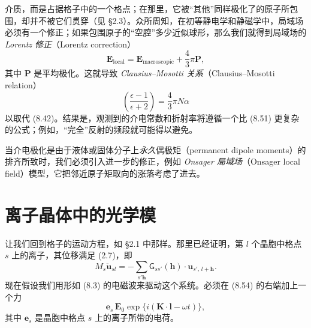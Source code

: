介质，而是占据格子中的一个格点；在那里，它被“其他”同样极化了的原子所包围，却并不被它们贯穿（见 §2.3）。众所周知，在初等静电学和静磁学中，局域场必须有一个修正；如果包围原子的“空腔”多少近似球形，那么我们就得到局域场的 \emph{Lorentz 修正}（Lorentz correction）
\begin{equation*}
\mathbf{E}_{\mathrm{local}} = \mathbf{E}_{\mathrm{macroscopic}} + \frac{4}{3}\pi\mathbf{P},\tag{8.52}
\end{equation*}
其中 $\mathbf{P}$ 是平均极化。这就导致 \emph{Clausius–Mosotti 关系}（Clausius–Mosotti relation）
\begin{equation*}
\left(\frac{\epsilon-1}{\epsilon+2}\right) = \frac{4}{3}\pi N\alpha\tag{8.53}
\end{equation*}
以取代 (8.42)。结果是，观测到的介电常数和折射率将遵循一个比 (8.51) 更复杂的公式；例如，“完全”反射的频段就可能得以避免。

当介电极化是由于液体或固体分子上\emph{永久}偶极矩（permanent dipole moments）的排齐所致时，我们必须引入进一步的修正，例如 \emph{Onsager 局域场}（Onsager local field）模型，它把邻近原子矩取向的涨落考虑了进去。

\section{离子晶体中的光学模}

让我们回到格子的运动方程，如 §2.1 中那样。那里已经证明，第 $l$ 个晶胞中格点 $s$ 上的离子，其位移满足 (2.7)，即
\begin{equation*}
M_s \ddot{\mathbf{u}}_{sl} = -\sum_{s'\boldsymbol{h}} \mathsf{G}_{ss'}(\boldsymbol{h})\cdot\mathbf{u}_{s',\,l+\boldsymbol{h}}.\tag{8.54}
\end{equation*}
现在假设我们用形如 (8.3) 的电磁波来驱动这个系统。必须在 (8.54) 的右端加上一个力
\begin{equation*}
\boldsymbol{e}_s\,\mathbf{E}_0\exp\{i(\mathbf{K}\cdot\boldsymbol{l}-\omega t)\},\tag{8.55}
\end{equation*}
其中 $\boldsymbol{e}_s$ 是晶胞中格点 $s$ 上的离子所带的电荷。

